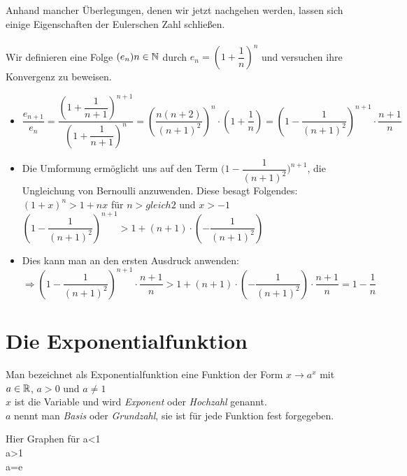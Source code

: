 Anhand mancher Überlegungen, denen wir jetzt nachgehen werden, lassen sich einige Eigenschaften der Eulerschen Zahl schließen.\\
\\ Wir definieren eine Folge $(e_{n})n\in\mathbb{N}$ durch $e_{n}=(1+\dfrac{1}{n})^n$ und versuchen ihre Konvergenz zu beweisen.
\begin{itemize}
\item$\dfrac{e_{n+1}}{e_{n}}=\dfrac{{(1+\dfrac{1}{n+1})}^{n+1}}{{(1+\dfrac{1}{n+1})}^{n}}=(\dfrac{n(n+2)}{(n+1)^2})^n\cdot(1+\dfrac{1}{n})=(1-\dfrac{1}{(n+1)^2})^{n+1}\cdot\dfrac{n+1}{n}$
\item Die Umformung ermöglicht uns auf den Term ${(1-\dfrac{1}{(n+1)^2}})^{n+1}$, die Ungleichung von Bernoulli anzuwenden. Diese besagt Folgendes: $(1+x)^n>1+nx$ für $n>gleich2$ und $x>-1$\\
$(1-\dfrac{1}{(n+1)^2})^{n+1}>1+(n+1)\cdot(-\dfrac{1}{(n+1)^2})$
\item Dies kann man an den ersten Ausdruck anwenden:\\
$\Rightarrow(1-\dfrac{1}{(n+1)^2})^{n+1}\cdot\dfrac{n+1}{n}>1+(n+1)\cdot(-\dfrac{1}{(n+1)^2})\cdot\dfrac{n+1}{n}=1-\dfrac{1}{n}$

\end{itemize}

		\section{Die Exponentialfunktion}

\begin{Definition}
Man bezeichnet als Exponentialfunktion eine Funktion der Form $x\rightarrow a^x$ mit $a\in \mathbb{R}$, $a>0$ und $a\neq1$\\
$x$ ist die Variable und wird \textit{Exponent} oder \textit{Hochzahl} genannt.\\
$a$ nennt man \textit{Basis} oder \textit{Grundzahl}, sie ist für jede Funktion fest forgegeben.
\end{Definition}

Hier Graphen für a<1\\
a>1\\
a=e\\

